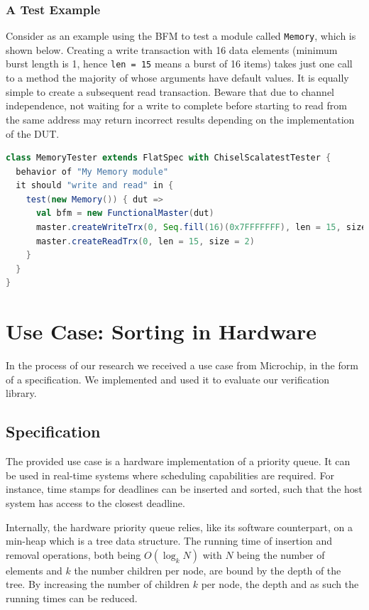 \documentclass[conference]{IEEEtran}
\begin{document}
\subsubsection{A Test Example}
Consider as an example using the BFM to test a module called \texttt{Memory}, which is shown below. Creating a write transaction with 16 data elements (minimum burst length is 1, hence \texttt{len = 15} means a burst of 16 items) takes just one call to a method the majority of whose arguments have default values. It is equally simple to create a subsequent read transaction. Beware that due to channel independence, not waiting for a write to complete before starting to read from the same address may return incorrect results depending on the implementation of the DUT.
\begin{lstlisting}[language=scala, caption={Using the AXI4 BFM with ChiselTest}, label={lst:axitest}]
class MemoryTester extends FlatSpec with ChiselScalatestTester {
  behavior of "My Memory module"
  it should "write and read" in {
    test(new Memory()) { dut =>
      val bfm = new FunctionalMaster(dut)
      master.createWriteTrx(0, Seq.fill(16)(0x7FFFFFFF), len = 15, size = 2)
      master.createReadTrx(0, len = 15, size = 2)
    }
  }
}
\end{lstlisting}

\section{Use Case: Sorting in Hardware}

In the process of our research we received a use case from Microchip, in the form of a specification.
We implemented and used it to evaluate our verification library.

\subsection{Specification}

The provided use case is a hardware implementation of a priority queue. It can be used in real-time systems where scheduling capabilities are required. For instance, time stamps for deadlines can be inserted and sorted, such that the host system has access to the closest deadline.

Internally, the hardware priority queue relies, like its software counterpart, on a min-heap which is a tree data structure. The running time of insertion and removal operations, both being $O(\log_k N)$ with $N$ being the number of elements and $k$ the number children per node, are bound by the depth of the tree. By increasing the number of children $k$ per node, the depth and as such the running times can be reduced.
\end{document}
